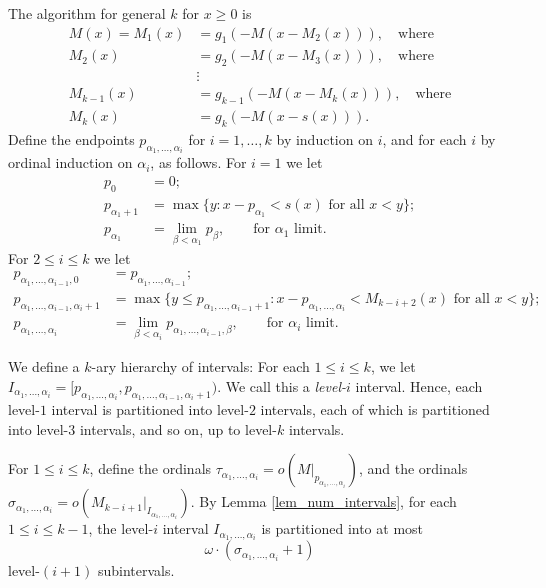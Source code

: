\documentclass{article}
\theoremstyle{definition}
\begin{document}
The algorithm for general $k$ for $x\ge 0$ is
\begin{align*}
M(x) = M_1(x) &= g_1(-M(x-M_2(x))), \quad\text{where}\\
M_2(x) &= g_2(-M(x-M_3(x))), \quad\text{where}\\
&\vdots\\
M_{k-1}(x) &= g_{k-1}(-M(x-M_k(x))), \quad\text{where}\\
M_k(x) &= g_k(-M(x-s(x))).
\end{align*}
Define the endpoints $p_{\alpha_1,\ldots,\alpha_i}$ for $i=1,\ldots,k$ by induction on $i$, and for each $i$ by ordinal induction on $\alpha_i$, as follows. For $i=1$ we let
\begin{align*}
    p_0 &= 0;\\
    p_{\alpha_1+1} &= \max{\{y: x-p_{\alpha_1}<s(x) \text{ for all $x<y$}\}};\\
    p_{\alpha_1} &= \lim_{\beta<\alpha_1} p_\beta,\qquad \text{for $\alpha_1$ limit}.
\end{align*}
For $2\le i\le k$ we let
\begin{align*}
    p_{\alpha_1,\ldots,\alpha_{i-1},0}&=p_{\alpha_1,\ldots,\alpha_{i-1}};\\
    p_{\alpha_1,\ldots,\alpha_{i-1},\alpha_i+1} &= \max{\{y\le p_{\alpha_1,\ldots,\alpha_{i-1}+1}: x-p_{\alpha_1,\ldots,\alpha_i}<M_{k-i+2}(x) \text{ for all $x<y$}\}};\\
    p_{\alpha_1,\ldots,\alpha_i}&=\lim_{\beta<\alpha_i} p_{\alpha_1,\ldots,\alpha_{i-1},\beta},\qquad\text{for $\alpha_i$ limit}.
\end{align*}

We define a $k$-ary hierarchy of intervals: For each $1\le i\le k$, we let $I_{\alpha_1,\ldots,\alpha_i} = [p_{\alpha_1,\ldots,\alpha_i},p_{\alpha_1,\ldots,\alpha_{i-1},\alpha_i+1})$. We call this a \emph{level-$i$} interval. Hence, each level-$1$ interval is partitioned into level-$2$ intervals, each of which is partitioned into level-$3$ intervals, and so on, up to level-$k$ intervals.

For $1\le i\le k$, define the ordinals $\tau_{\alpha_1,\ldots,\alpha_i}=o(M|_{p_{\alpha_1,\ldots,\alpha_i}})$, and the ordinals $\sigma_{\alpha_1,\ldots,\alpha_i}=o(M_{k-i+1}|_{I_{\alpha_1,\ldots,\alpha_i}})$. By Lemma \ref{lem_num_intervals}, for each $1\le i\le k-1$, the level-$i$ interval $I_{\alpha_1,\ldots,\alpha_i}$ is partitioned into at most
\begin{equation}\label{eq_num_subintervals}
    \omega\cdot(\sigma_{\alpha_1,\ldots,\alpha_i}+1)
\end{equation}
level-$(i+1)$ subintervals.
\end{document}
